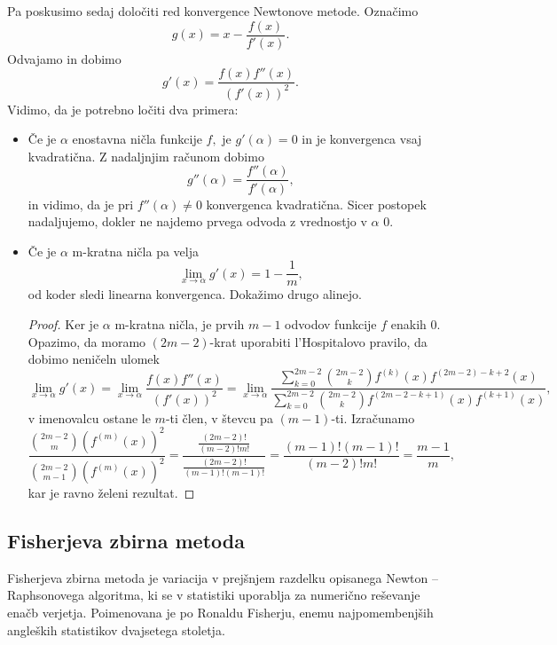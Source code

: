 \documentclass[12pt,a4paper]{amsart}
\theoremstyle{definition} %
\theoremstyle{plain} %
\begin{document}
Pa poskusimo sedaj določiti red konvergence Newtonove metode. Označimo
\[
    g(x) = x - \frac{f(x)}{f'(x)}.
\]
Odvajamo in dobimo
\[
    g'(x) = \frac{f(x)f''(x)}{(f'(x))^{2}}.
\]
Vidimo, da je potrebno ločiti dva primera:
\begin{itemize}
    \item Če je $\alpha$ enostavna ničla funkcije $f,$ je $g'(\alpha)=0$ in je konvergenca vsaj kvadratična. Z nadaljnjim računom dobimo
    \[
        g''(\alpha) = \frac{f''(\alpha)}{f'(\alpha)},
    \]
    in vidimo, da je pri $f''(\alpha) \neq 0$ konvergenca kvadratična. Sicer postopek nadaljujemo, dokler ne najdemo prvega odvoda z vrednostjo v $\alpha$ 0.
    \item Če je $\alpha$ m-kratna ničla pa velja
    \[
        \lim_{x\to\alpha} g'(x) = 1 - \frac{1}{m},
    \]
    od koder sledi linearna konvergenca. Dokažimo drugo alinejo.
    \begin{proof}
        Ker je $\alpha$ m-kratna ničla, je prvih $m-1$ odvodov funkcije $f$ enakih 0. Opazimo, da moramo $(2m-2)$-krat uporabiti l'Hospitalovo pravilo, da dobimo neničeln ulomek
        \begin{equation*}
            \lim_{x\to\alpha} g'(x) = \lim_{x\to\alpha} \frac{f(x)f''(x)}{(f'(x))^{2}}
            = \lim_{x\to\alpha} \frac{\sum_{k=0}^{2m-2}\binom{2m-2}{k}f^{(k)}(x)f^{(2m-2)-k+2}(x)}{\sum_{k=0}^{2m-2}\binom{2m-2}{k}f^{(2m-2-k+1)}(x)f^{(k+1)}(x)},
        \end{equation*}
        v imenovalcu ostane le $m$-ti člen, v števcu pa $(m-1)$-ti. Izračunamo
        \[
            \frac{\binom{2m-2}{m}(f^{(m)}(x))^{2}}{\binom{2m-2}{m-1}(f^{(m)}(x))^{2}} = \frac{\frac{(2m-2)!}{(m-2)!m!}}{\frac{(2m-2)!}{(m-1)!(m-1)!}} = \frac{(m-1)!(m-1)!}{(m-2)!m!} = \frac{m-1}{m},
        \]
        kar je ravno želeni rezultat.
    \end{proof}

\end{itemize}
\subsection{Fisherjeva zbirna metoda}
Fisherjeva zbirna metoda je variacija v prejšnjem razdelku opisanega Newton -- Raphsonovega algoritma, ki se v statistiki uporablja za numerično reševanje enačb 
verjetja. Poimenovana je po Ronaldu Fisherju, enemu najpomembenjših angleških statistikov dvajsetega stoletja.
\end{document}
